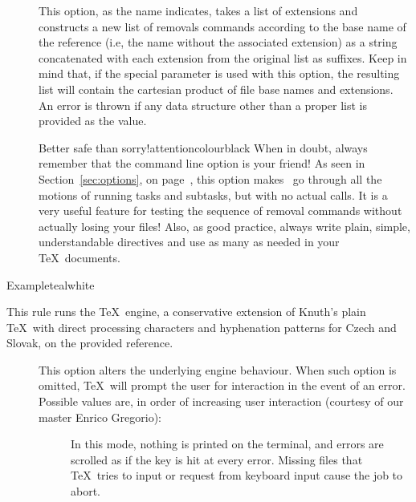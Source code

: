 \begin{description}
\begin{description}
\item[] This option, as the name indicates, takes a list of extensions and constructs a new list of removals commands according to the base name of the  reference (i.e, the name without the associated extension) as a string concatenated with each extension from the original list as suffixes. Keep in mind that, if the special  parameter is used with this option, the resulting list will contain the cartesian product of file base names and extensions. An error is thrown if any data structure other than a proper list is provided as the value.

\begin{messagebox}{Better safe than sorry!}{attentioncolour}{\icattention}{black}
When in doubt, always remember that the  command line option is your friend! As seen in Section~\ref{sec:options}, on page~\pageref{sec:options}, this option makes \arara\ go through all the motions of running tasks and subtasks, but with no actual calls. It is a very useful feature for testing the sequence of removal commands without actually losing your files! Also, as good practice, always write plain, simple, understandable  directives and use as many as needed in your \TeX\ documents.
\end{messagebox}
\end{description}

\begin{codebox}{Example}{teal}{\icnote}{white}
\end{codebox}

\item[\rulebox{csplain}{Paulo Cereda}] This rule runs the  \TeX\ engine, a conservative extension of Knuth's plain \TeX\ with direct processing characters and hyphenation patterns for Czech and Slovak, on the provided  reference.

\begin{description}
\item[] This option alters the underlying engine behaviour. When such option is omitted, \TeX\ will prompt the user for interaction in the event of an error. Possible values are, in order of increasing user interaction (courtesy of our master Enrico Gregorio):

\begin{description}
\item[] In this mode, nothing is printed on the terminal, and errors are scrolled as if the  key is hit at every error. Missing files that \TeX\ tries to input or request from keyboard input cause the job to abort.


\end{description}
\end{description}
\end{description}

